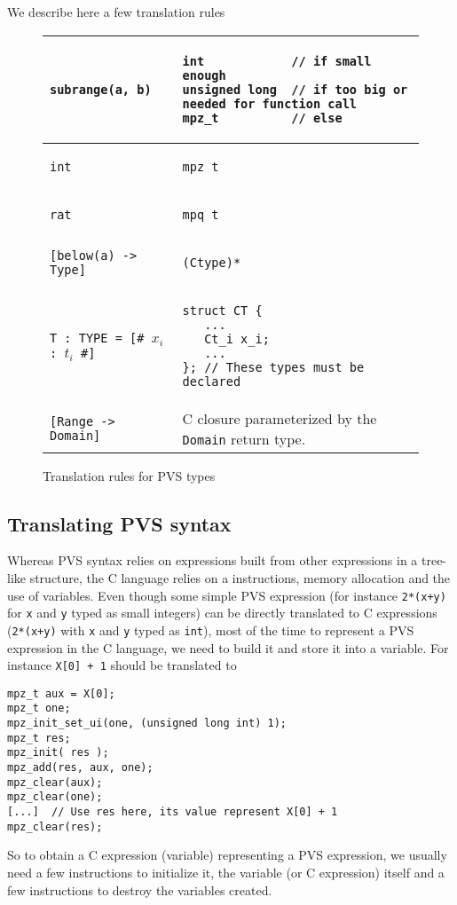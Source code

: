 \documentclass[12pt,a4paper]{article}
\newcommand{\cl}[1]{\texttt{#1}}
\begin{document}
We describe here a few translation rules
\begin{figure}[!ht]
\begin{tabular}{|l|l|}
\hline
\cl{subrange(a, b)} &
\begin{lstlisting}
int            // if small enough
unsigned long  // if too big or needed for function call
mpz_t          // else
\end{lstlisting} \\ \hline
\cl{int} &
\begin{lstlisting}
mpz_t
\end{lstlisting} \\ \hline
\cl{rat} &
\begin{lstlisting}
mpq_t
\end{lstlisting} \\ \hline
\cl{[below(a) -> Type]} &
\begin{lstlisting}
(Ctype)*
\end{lstlisting} \\ \hline
\cl{T : TYPE = [\# $x_i$ : $t_i$ \#]}  &
\begin{lstlisting}
struct CT {
   ...
   Ct_i x_i;
   ...
}; // These types must be declared
\end{lstlisting} \\ \hline
\cl{[Range -> Domain]} & C closure parameterized by the \cl{Domain} return type.\\ \hline
\end{tabular}
\caption{Translation rules for PVS types}
\end{figure}


\subsection{Translating PVS syntax}
\label{subsec:pvssyntax}

Whereas PVS syntax relies on expressions built from other expressions in a tree-like structure, the C language relies on a instructions, memory allocation and the use of variables. Even though some simple PVS expression (for instance \cl{2*(x+y)} for \cl{x} and \cl{y} typed as small integers) can be directly translated to C expressions (\cl{2*(x+y)} with \cl{x} and \cl{y} typed as \cl{int}), most of the time to represent a PVS expression in the C language, we need to build it and store it into a variable. For instance \cl{X[0] + 1} should be translated to
\begin{lstlisting}
mpz_t aux = X[0];
mpz_t one;
mpz_init_set_ui(one, (unsigned long int) 1);
mpz_t res;
mpz_init( res );
mpz_add(res, aux, one);
mpz_clear(aux);
mpz_clear(one);
[...]  // Use res here, its value represent X[0] + 1
mpz_clear(res);
\end{lstlisting}
So to obtain a C expression (variable) representing a PVS expression, we usually need a few instructions to initialize it, the variable (or C expression) itself and a few instructions to destroy the variables created. \\
\end{document}
